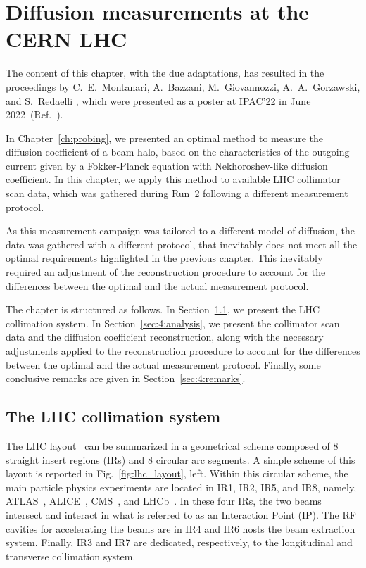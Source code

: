 \chapter{Diffusion measurements at the CERN LHC}\label{ch:diffusion_meas}
\noindent\textsf{The content of this chapter, with the due adaptations, has resulted in the proceedings by C.\ E.\ Montanari, A.\ Bazzani, M.\ Giovannozzi, A.\ A.\ Gorzawski, and S.\ Redaelli \textit{}, which were presented as a poster at IPAC'22 in June 2022~(Ref.~\cite{montanari:ipac22-mopost043}).}

\vspace{3em}

In Chapter~\ref{ch:probing}, we presented an optimal method to measure the diffusion coefficient of a beam halo, based on the characteristics of the outgoing current given by a Fokker-Planck equation with Nekhoroshev-like diffusion coefficient. In this chapter, we apply this method to available LHC collimator scan data, which was gathered during Run~2 following a different measurement protocol.

As this measurement campaign was tailored to a different model of diffusion, the data was gathered with a different protocol, that inevitably does not meet all the optimal requirements highlighted in the previous chapter. This inevitably required an adjustment of the reconstruction procedure to account for the differences between the optimal and the actual measurement protocol.

The chapter is structured as follows. In Section~\ref{sec:4:collimation}, we present the LHC collimation system. In Section~\ref{sec:4:analysis}, we present the collimator scan data and the diffusion coefficient reconstruction, along with the necessary adjustments applied to the reconstruction procedure to account for the differences between the optimal and the actual measurement protocol. Finally, some conclusive remarks are given in Section~\ref{sec:4:remarks}.

\section{The LHC collimation system}\label{sec:4:collimation}

The LHC layout~\cite{Bruning:782076} can be summarized in a geometrical scheme composed of 8 straight insert regions (IRs) and 8 circular arc segments. A simple scheme of this layout is reported in Fig.~\ref{fig:lhc_layout}, left. Within this circular scheme, the main particle physics experiments are located in IR1, IR2, IR5, and IR8, namely, ATLAS~\cite{TheATLASCollaboration_2008}, ALICE~\cite{Alessandro:879894}, CMS~\cite{Chatrchyan:1129810}, and LHCb~\cite{Alves:1129809}. In these four IRs, the two beams intersect and interact in what is referred to as an Interaction Point (IP). The RF cavities for accelerating the beams are in IR4 and IR6 hosts the beam extraction system. Finally, IR3 and IR7 are dedicated, respectively, to the longitudinal and transverse collimation system.


